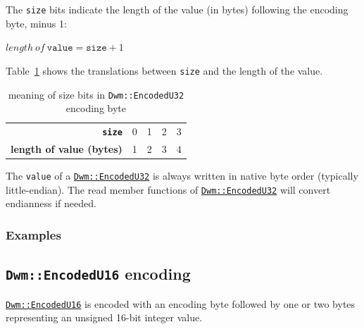 The \texttt{size} bits indicate the length of the value (in bytes)
following the encoding byte, minus 1:

  $length\ of\ \texttt{value} = \texttt{size} + 1$

Table~\ref{table:EncodedU32SizeBits} shows the translations between
\texttt{size} and the length of the value.

\begin{table}[H]
\begin{center}
\begin{tabular}{r|l|l|l|l}
  \textbf{\texttt{size}} & 0 & 1 & 2 & 3 \\
  \textbf{length of value (bytes)} & 1 & 2 & 3 & 4 \\
\end{tabular}
\end{center}
\caption{meaning of size bits in \texttt{Dwm::EncodedU32} encoding byte}
\label{table:EncodedU32SizeBits}
\end{table}

The \texttt{value} of a
\hyperref[class:EncodedU32]{\texttt{Dwm::EncodedU32}} is always
written in native byte order (typically little-endian). The read
member functions of
\hyperref[class:EncodedU32]{\texttt{Dwm::EncodedU32}} will convert
endianness if needed.

\subsubsection{Examples}







\subsection{\texttt{Dwm::EncodedU16} encoding}\label{encoding:DwmEncodedU16}
\hyperref[class:EncodedU16]{\texttt{Dwm::EncodedU16}} is encoded with
an encoding byte followed by one or two bytes representing an
unsigned 16-bit integer value.

